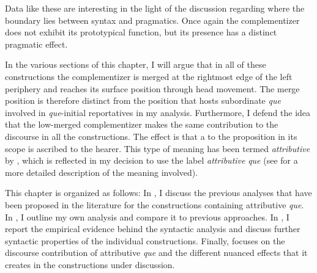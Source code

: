  Data like these are interesting in the light of the discussion regarding where   the boundary lies  between syntax and pragmatics. Once again the complementizer does not exhibit its prototypical function, but its presence has a distinct pragmatic effect.  

In the various sections of this chapter, I will argue that in all of these constructions  the complementizer is merged at the rightmost edge of the left periphery and reaches its surface position through head movement. The merge position is therefore distinct from  the position that hosts subordinate \emph{que} involved in \emph{que}-initial reportatives in my analysis.  Furthermore, I defend the idea that the low-merged complementizer makes the same  contribution to the discourse in all the constructions. The effect is that a  to the proposition in its scope is ascribed to the hearer. This type of meaning has been termed \emph{attributive} by \citet{Poschmann2008}, which is reflected in my decision to use the  label \emph{attributive} \emph{que} (see  for a more detailed description of the meaning involved).

This chapter is organized as follows: In , I discuss the previous analyses that have been proposed in the literature for the  constructions containing attributive \emph{que}. In , I outline my own analysis and compare it to previous approaches. In , I report the empirical evidence behind the syntactic analysis and discuss further syntactic properties of the individual constructions. Finally,  focuses on the discourse contribution of attributive \emph{que} and the different nuanced effects that it creates in the constructions under discussion. 


 


